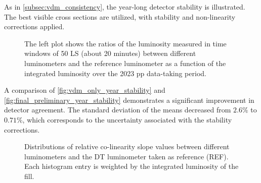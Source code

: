 As in \autoref{subsec:vdm_consistency}, the year-long detector stability is illustrated. The best visible cross sections are utilized, with stability and non-linearity corrections applied.

\begin{figure}[!htb]
    \centering
    \caption[Final full year stability]{The left plot shows the ratios of the luminosity measured in time windows of 50 LS (about 20 minutes) between different luminometers and the reference luminometer as a function of the integrated luminosity over the 2023 pp data-taking period.}
    \label{fig:final_preliminary_year_stability}
\end{figure}

A comparison of \autoref{fig:vdm_only_year_stability} and \autoref{fig:final_preliminary_year_stability} demonstrates a significant improvement in detector agreement. The standard deviation of the means decreased from $2.6\%$ to $0.71\%$, which corresponds to the uncertainty associated with the stability corrections.

\begin{figure}[!htb]
    \centering
    \caption[Residual relative non-linearity distributions]{Distributions of relative co-linearity slope values between different luminometers and the DT luminometer taken as reference (REF). Each histogram entry is weighted by the integrated luminosity of the fill.}
    \label{fig:year_slopes_final}
\end{figure}

